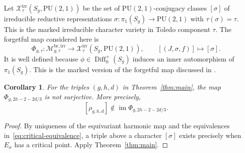 \documentclass[12pt]{amsart}
\newtheorem{corollary}[theorem]{Corollary}
\theoremstyle{remark}
\newcommand{\cX}{\mathcal X}
\newcommand{\PU}{\mathrm{PU}}
\begin{document}
Let $\cX_\tau^{\mathrm{irr}}(S_g,\PU(2,1))$ be the set of
$\PU(2,1)$-conjugacy classes $[\sigma]$ of irreducible reductive
representations $\sigma:\pi_1(S_g)\to\PU(2,1)$ with
$\tau(\sigma)=\tau$.  This is the marked irreducible character variety in
Toledo component $\tau$.  The forgetful map considered here is
\begin{equation}\label{eq:forgetful-map}
 \Phi_{g,\tau}:\mathcal M^{\mathrm{br,irr}}_{g,\tau}
 \longrightarrow\cX_\tau^{\mathrm{irr}}(S_g,\PU(2,1)),
 \qquad [(J,\sigma,f)]\longmapsto[\sigma].
\end{equation}
It is well defined because $\phi\in\operatorname{Diff}_0^+(S_g)$ induces an
inner automorphism of $\pi_1(S_g)$.  This is the marked version of the
forgetful map discussed in \cite[Section~6.3]{LoftinMcIntosh}.

\begin{corollary}\label{cor:nonsurjective}
For the triples $(g,h,d)$ in Theorem~\ref{thm:main}, the map
$\Phi_{g,2h-2-2d/3}$ is not surjective.  More precisely,
\[
 [\rho_{g,h,d}]\notin\operatorname{im}\Phi_{g,2h-2-2d/3}.
\]
\end{corollary}

\begin{proof}
By uniqueness of the equivariant harmonic map and the equivalences
in~\eqref{eq:critical-equivalence}, a triple above a character $[\sigma]$
exists precisely when $E_\sigma$ has a critical point.  Apply
Theorem~\ref{thm:main}.
\end{proof}
\end{document}

